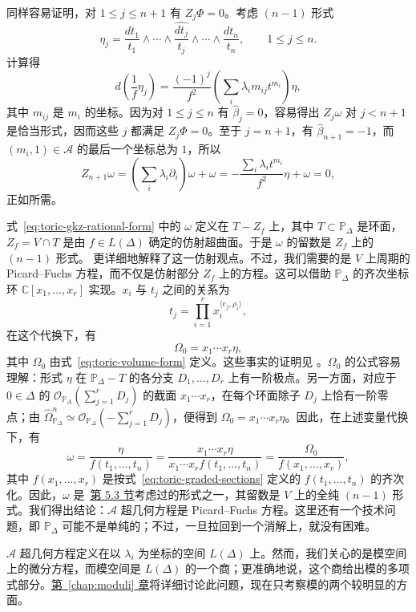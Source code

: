同样容易证明，对 $1\leq j\leq n+1$ 有 $Z_j\Phi=0$。考虑 $(n-1)$ 形式
\[
\eta_j=\frac{dt_1}{t_1}\wedge\cdots\wedge
\widehat{\frac{dt_j}{t_j}}\wedge\cdots\wedge\frac{dt_n}{t_n},
\qquad 1\leq j\leq n.
\]
计算得
\[
d\left(\frac1f\eta_j\right)
=\frac{(-1)^j}{f^2}\left(\sum_i\lambda_im_{ij}t^{m_i}\right)\eta,
\]
其中 $m_{ij}$ 是 $m_i$ 的坐标。因为对 $1\leq j\leq n$ 有 $\widehat\beta_j=0$，容易得出 $Z_j\omega$ 对 $j<n+1$ 是恰当形式，因而这些 $j$ 都满足 $Z_j\Phi=0$。至于 $j=n+1$，有 $\widehat\beta_{n+1}=-1$，而 $(m_i,1)\in\mathcal A$ 的最后一个坐标总为 $1$，所以
\[
Z_{n+1}\omega=\left(\sum_i\lambda_i\partial_i\right)\omega+\omega
=-\frac{\sum_i\lambda_it^{m_i}}{f^2}\eta+\omega=0,
\]
正如所需。

式~\eqref{eq:toric-gkz-rational-form} 中的 $\omega$ 定义在 $T-Z_f$ 上，其中 $T\subset\mathbb P_\Delta$ 是环面，$Z_f=V\cap T$ 是由 $f\in L(\Delta)$ 确定的仿射超曲面。于是 $\omega$ 的留数是 $Z_f$ 上的 $(n-1)$ 形式。 更详细地解释了这一仿射观点。不过，我们需要的是 $V$ 上周期的 Picard--Fuchs 方程，而不仅是仿射部分 $Z_f$ 上的方程。这可以借助 $\mathbb P_\Delta$ 的齐次坐标环 $\mathbb C[x_1,\ldots,x_r]$ 实现。$x_i$ 与 $t_j$ 之间的关系为
\[
t_j=\prod_{i=1}^r x_i^{\langle e_j,\rho_i\rangle},
\]
在这个代换下，有
\[
\Omega_0=x_1\cdots x_r\eta,
\]
其中 $\Omega_0$ 由式~\eqref{eq:toric-volume-form} 定义。这些事实的证明见 。$\Omega_0$ 的公式容易理解：形式 $\eta$ 在 $\mathbb P_\Delta-T$ 的各分支 $D_1,\ldots,D_r$ 上有一阶极点。另一方面，对应于 $0\in\Delta$ 的 $\mathcal O_{\mathbb P_\Delta}(\sum_{j=1}^rD_j)$ 的截面 $x_1\cdots x_r$，在每个环面除子 $D_j$ 上恰有一阶零点；由
$\widehat\Omega_{\mathbb P_\Delta}^n\simeq\mathcal O_{\mathbb P_\Delta}(-\sum_{j=1}^rD_j)$，便得到 $\Omega_0=x_1\cdots x_r\eta$。因此，在上述变量代换下，有
\[
\omega=\frac{\eta}{f(t_1,\ldots,t_n)}
=\frac{x_1\cdots x_r\eta}{x_1\cdots x_r f(t_1,\ldots,t_n)}
=\frac{\Omega_0}{f(x_1,\ldots,x_r)},
\]
其中 $f(x_1,\ldots,x_r)$ 是按式~\eqref{eq:toric-graded-sections} 定义的 $f(t_1,\ldots,t_n)$ 的齐次化。因此，$\omega$ 是~\hyperref[sec:griffiths-dwork]{第 5.3 节}考虑过的形式之一，其留数是 $V$ 上的全纯 $(n-1)$ 形式。我们得出结论：$\mathcal A$ 超几何方程是 Picard--Fuchs 方程。这里还有一个技术问题，即 $\mathbb P_\Delta$ 可能不是单纯的；不过，一旦拉回到一个消解上，就没有困难。

$\mathcal A$ 超几何方程定义在以 $\lambda_i$ 为坐标的空间 $L(\Delta)$ 上。然而，我们关心的是模空间上的微分方程，而模空间是 $L(\Delta)$ 的一个商；更准确地说，这个商给出模的多项式部分。\hyperref[chap:moduli]{第~\ref*{chap:moduli} 章}将详细讨论此问题，现在只考察模的两个较明显的方面。

